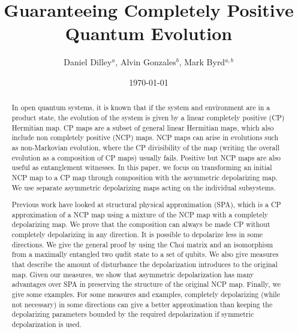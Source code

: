 \documentclass[12pt]{iopart}
\begin{document}
\title{Guaranteeing Completely Positive Quantum Evolution} %
\author{Daniel Dilley$^a$, Alvin Gonzales$^b$, Mark Byrd$^{a,b}$}
\address{$^a$ Department of Physics, Southern Illinois University, 1245 Lincoln Dr, Carbondale, IL 62901}
\address{$^b$ School of Computing, Southern Illinois University, 1230 Lincoln Dr, Carbondale, IL 62901}
\vspace{10pt}
\begin{indented}
\item[]
\date{\today}
\end{indented}

\begin{abstract}
    In open quantum systems, it is known that if the system and environment are in a product state, the evolution of the system is given by a linear completely positive (CP) Hermitian map. CP maps are a subset of general linear Hermitian maps, which also include non completely positive (NCP) maps. NCP maps can arise in evolutions such as non-Markovian evolution, where the CP divisibility of the map (writing the overall evolution as a composition of CP maps) usually fails. Positive but NCP maps are also useful as entanglement witnesses. In this paper, we focus on transforming an initial NCP map to a CP map through composition with the asymmetric depolarizing map. We use separate asymmetric depolarizing maps acting on the individual subsystems.

    Previous work have looked at structural physical approximation (SPA), which is a CP approximation of a NCP map using a mixture of the NCP map with a completely depolarizing map. We prove that the composition can always be made CP without completely depolarizing in any direction. It is possible to depolarize less in some directions. We give the general proof by using the Choi matrix and an isomorphism from a maximally entangled two qudit state to a set of qubits.  We also give measures that describe the amount of disturbance the depolarization introduces to the original map. Given our measures, we show that asymmetric depolarization has many advantages over SPA in preserving the structure of the original NCP map. Finally, we give some examples. For some measures and examples, completely depolarizing (while not necessary) in some directions can give a better approximation than keeping the depolarizing parameters bounded by the required depolarization if symmetric depolarization is used.
\end{abstract}
\end{document}
